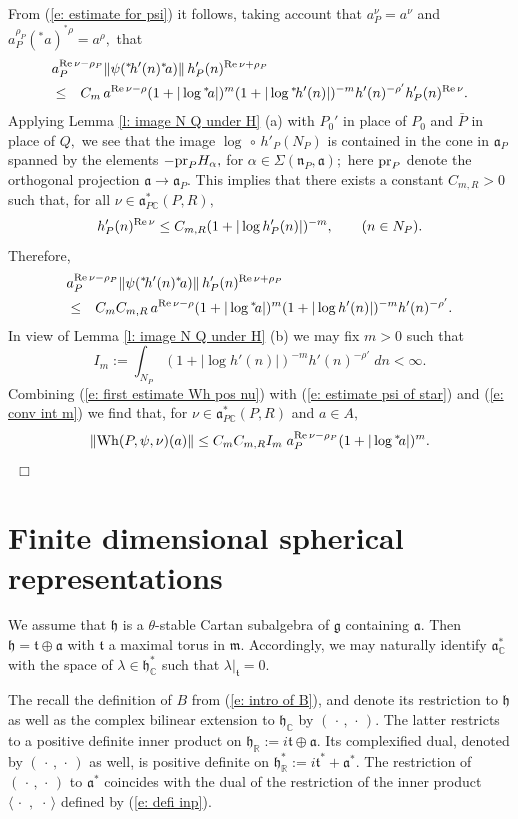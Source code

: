 \documentclass[12pt,a4paper]{article}
\def\qed{~\hfill\hbox{$\Box$}\medbreak}
\def\qquad{\quad\quad}
\def\msy#1{{\mathbb #1}}
\def\C{{\msy C}}
\def\R{{\msy R}}
\def\ga{\alpha}
\def\gl{\lambda}
\def\gS{\Sigma}
\def\got#1{\mathfrak #1}
\def\fa{{\got a}}
\def\fg{{\got g}}
\def\fh{{\got h}}
\def\fm{{\got m}}
\def\fn{{\got n}}
\def\ft{{\got t}}
\def\to{\rightarrow}
\def\Re{{\rm Re}\,}
\def\inp#1#2{\langle#1\,,\,#2\rangle}
\def\after{\,{\scriptstyle\circ}\,}
\def\pr{{\rm pr}}
\def\iC{{\scriptscriptstyle \C}}
\def\iR{{\scriptscriptstyle \R}}
\numberwithin{Thm}{section}
\numberwithin{equation}{section}
\def\dotvar{\, \cdot\,}
\def\Wh{{\rm Wh}}
\def\fadc{\fa_\C^*}
\def\faPdc{{\fa_{P\iC}^*}}
\def\fhdc{\fh_\iC^*}
\def\Cartan{\theta}
\numberwithin{equation}{section}
\def\ft{\mathfrak t}
\def\fhdc{\fh_\iC^*}
\def\faPdc{\fa_{P\iC}^*}
\def\fh{{\mathfrak h}}
\def\Cartan{\theta}
\def\Rinp#1#2{(#1,#2)}
\begin{document}
From (\ref{e: estimate for psi}) it follows, taking account that
$a_P^\nu = a^\nu$ and $a_P^{\rho_P}({}^*\!a)^{{}^*\rho}  = a^\rho,$  that 
\begin{eqnarray*} 
\lefteqn{a_P^{\Re \nu -\rho_P} \|\psi({}^*\!h'(n) {}^*\! a)\|  \, h_P'(n)^{\Re \nu + \rho_P} }\\
& \leq & C_m \, a^{\Re \nu - \rho}(1 + |\log {}^*\!a|)^m (1 + |\log {}^*\!h'(n)|)^{-m} h'(n)^{- \rho'}h_P'(n)^{\Re \nu}.
\end{eqnarray*}
Applying Lemma \ref{l: image N Q under H} (a) with $P_0'$ in place of $P_0$ and 
$\bar P$ in place of $Q,$ we see that the image $\log \after h'_P(N_P)$ is contained in the cone
in $\fa_P$ spanned by the elements $- \pr_P H_\ga,$ for $\ga \in \gS(\fn_P, \fa);$ here
$\pr_P$ denote the orthogonal projection $\fa \to \fa_P.$  This implies
that there exists a constant $C_{m,R} > 0$ such that, for all $\nu \in \faPdc(P,R),$ 
$$ 
 h_P'(n)^{\Re \nu} \leq C_{m,R} ( 1+ | \log h'_P(n)|)^{-m}, \qquad (n \in N_P).
$$ 
Therefore,
\begin{eqnarray}
\lefteqn{a_P^{\Re \nu -\rho_P} \|\psi({}^*\!h'(n) {}^*\! a)\|  \, h_P'(n)^{\Re \nu + \rho_P}}\nonumber \\ 
& \leq &  C_m C_{m,R}\, a^{\Re \nu - \rho}(1 + |\log {}^*\!a|)^m 
(1 + |\log h'(n)|)^{-m} h'(n)^{- \rho'}.\label{e: estimate psi of star}
\end{eqnarray}
In view of Lemma \ref{l: image N Q under H} (b) we may fix $m>0$ such that 
\begin{equation}
\label{e: conv int m}
I_m:=  \int_{N_P} (1 + |\log h'(n)|)^{-m} h'(n)^{- \rho'}\; dn < \infty.
\end{equation} 
Combining (\ref{e: first estimate Wh pos nu}) with (\ref{e: estimate psi of star}) and (\ref{e: conv int m})
we find that, for $\nu \in \faPdc(P,R)$ and $a \in A,$ 
$$ 
\| \Wh(P, \psi, \nu)(a) \| \leq C_m C_{m,R} I_m \; a_P^{\Re \nu -\rho_P} (1 + |\log{}^*\!a |)^m.
$$ 
\qed

\section{Finite dimensional spherical representations}
\label{s: fin dim reps}
We assume that $\fh$  is a $\Cartan$-stable Cartan subalgebra of $\fg$ 
containing $\fa.$  Then $\fh = \ft \oplus \fa$ with $\ft$ a maximal torus in $\fm.$ 
Accordingly, we may naturally identify $\fadc$ with 
the space of $\gl \in \fhdc$ such that $\gl|_\ft = 0.$ 

The recall the definition of $B$ from (\ref{e: intro of B}), and denote its restriction to 
$\fh$ as well as the complex bilinear 
extension to $\fh_\iC$ by $\Rinp{\dotvar}{\dotvar}.$ The latter restricts to a positive definite inner product on $\fh_\iR:= i \ft \oplus \fa.$ Its complexified dual,
denoted by $\Rinp{\dotvar}{\dotvar}$ as well, is positive definite on $\fh_\iR^*:= i \ft^* + \fa^*.$ 
The restriction of $\Rinp{\dotvar}{\dotvar}$ to $\fa^*$ coincides with the dual of the restriction
of the inner product $\inp{\dotvar}{\dotvar}$ defined by (\ref{e: defi inp}).
\end{document}
